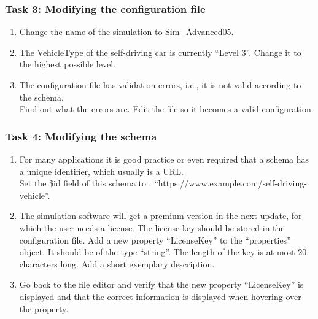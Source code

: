 \subsubsection{Task 3: Modifying the configuration file}
\begin{enumerate}
    \item Change the name of the simulation to Sim\_Advanced05.
    \item The VehicleType of the self-driving car is currently ``Level 3''.
    Change it to the highest possible level.
    \item The configuration file has validation errors, i.e., it is not valid according to the schema.
    \\ Find out what the errors are.
    Edit the file so it becomes a valid configuration.

\end{enumerate}

\subsubsection{Task 4: Modifying the schema}
\begin{enumerate}
    \item For many applications it is good practice or even required that a schema has a unique identifier, which usually is a URL.
          \\Set the \$id field of this schema to : ``https://www.example.com/self-driving-vehicle''.
    \item The simulation software will get a premium version in the next update, for which the user needs a license.
          The license key should be stored in the configuration file.
          Add a new property ``LicenseKey'' to the ``properties'' object.
          It should be of the type ``string''.
          The length of the key is at most 20 characters long.
    Add a short exemplary description.
    \item Go back to the file editor and verify that the new property ``LicenseKey'' is displayed and that the correct information is displayed when hovering over the property.
\end{enumerate}
